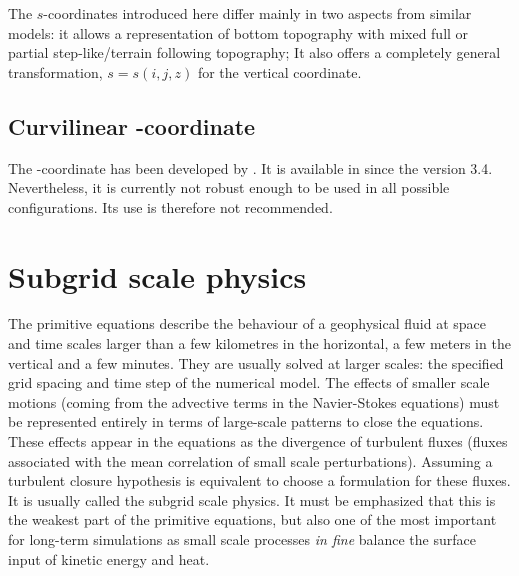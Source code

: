 \documentclass[../main/NEMO_manual]{subfiles}
\begin{document}
The $s$-coordinates introduced here \citep{Lott_al_OM90,Madec_al_JPO96} differ mainly in two aspects from
similar models:
it allows a representation of bottom topography with mixed full or partial step-like/terrain following topography;
It also offers a completely general transformation, $s=s(i,j,z)$ for the vertical coordinate.

\subsection{\texorpdfstring{Curvilinear \ztilde-coordinate}{}}
\label{subsec:PE_zco_tilde}

The \ztilde -coordinate has been developed by \citet{Leclair_Madec_OM11}.
It is available in \NEMO since the version 3.4.
Nevertheless, it is currently not robust enough to be used in all possible configurations.
Its use is therefore not recommended.

\newpage 

\section{Subgrid scale physics}
\label{sec:PE_zdf_ldf}

The primitive equations describe the behaviour of a geophysical fluid at space and time scales larger than
a few kilometres in the horizontal, a few meters in the vertical and a few minutes.
They are usually solved at larger scales: the specified grid spacing and time step of the numerical model.
The effects of smaller scale motions (coming from the advective terms in the Navier-Stokes equations)
must be represented entirely in terms of large-scale patterns to close the equations.
These effects appear in the equations as the divergence of turbulent fluxes
(\ie fluxes associated with the mean correlation of small scale perturbations).
Assuming a turbulent closure hypothesis is equivalent to choose a formulation for these fluxes.
It is usually called the subgrid scale physics.
It must be emphasized that this is the weakest part of the primitive equations,
but also one of the most important for long-term simulations as
small scale processes \textit{in fine} balance the surface input of kinetic energy and heat.
\end{document}
